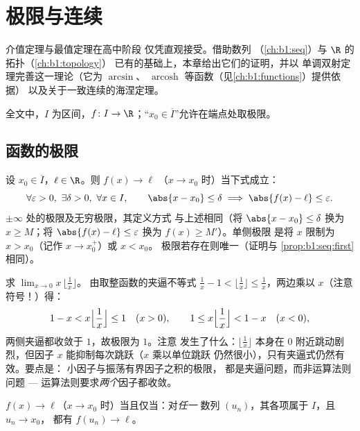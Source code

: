 \chapter{极限与连续}\label{ch:b1:continuity}

介值定理与最值定理在高中阶段
仅凭直观接受。借助数列
（\cref{ch:b1:seq}）与 $\R$ 的拓扑（\cref{ch:b1:topology}）
已有的基础上，本章给出它们的证明，并以
单调双射定理完善这一理论（它为 $\arcsin$、
$\operatorname{arcosh}$ 等函数（见\cref{ch:b1:functions}）提供依据）
以及关于一致连续的海涅定理。

全文中，$I$ 为区间，$f \colon I \to \R$；“$x_0 \in
\overline I$”允许在端点处取极限。

\section{函数的极限}

\begin{definition}[一点处的极限]\label{def:b1:continuity:limit}
设 $x_0 \in \overline{I}$，$\ell \in \R$。则 $f(x) \to \ell$
（$x \to x_0$ 时）当下式成立：
\[
\forall \varepsilon > 0,\ \exists \delta > 0,\ \forall x \in I,
\qquad \abs{x - x_0} \leq \delta \implies \abs{f(x) - \ell} \leq
\varepsilon .
\]
$\pm\infty$ 处的极限及无穷极限，其定义方式
与上述相同（将 $\abs{x - x_0} \leq \delta$ 换为 $x \geq M$；将 $\abs{f(x) -
\ell} \leq \varepsilon$ 换为 $f(x) \geq M'$）。单侧极限
是将 $x$ 限制为 $x > x_0$（记作 $x \to x_0^+$）或 $x < x_0$。
极限若存在则唯一（证明与
\cref{prop:b1:seq:first}相同）。
\end{definition}

\begin{example}[用夹逼准则求极限]\label{ex:b1:continuity:floorlimit}
求 $\lim_{x \to 0} x\,\bigl\lfloor \frac1x \bigr\rfloor$。
由取整函数的夹逼不等式 $\frac1x - 1 < \lfloor \frac1x \rfloor \leq
\frac1x$，两边乘以 $x$（注意符号！）得：
\[
1 - x < x\Bigl\lfloor \frac1x \Bigr\rfloor \leq 1 \quad (x > 0),
\qquad
1 \leq x\Bigl\lfloor \frac1x \Bigr\rfloor < 1 - x \quad (x < 0),
\]
两侧夹逼都收敛于 $1$，故极限为 $1$。注意
发生了什么：$\lfloor \frac1x\rfloor$ 本身在
$0$ 附近跳动剧烈，但因子 $x$ 能抑制每次跳跃（$x$ 乘以单位跳跃
仍然很小），只有夹逼式仍然有效。要点是：
小因子与振荡有界因子之积的极限，
都是夹逼问题，而非运算法则问题 ---
运算法则要求\emph{两个}因子都收敛。
\end{example}

\begin{theorem}[数列刻画]\label{thm:b1:continuity:seqchar}
$f(x) \to \ell$（$x \to x_0$ 时）当且仅当：对\emph{任一}
数列 $(u_n)$，其各项属于 $I$，且 $u_n \to x_0$，
都有 $f(u_n) \to \ell$。
\end{theorem}

